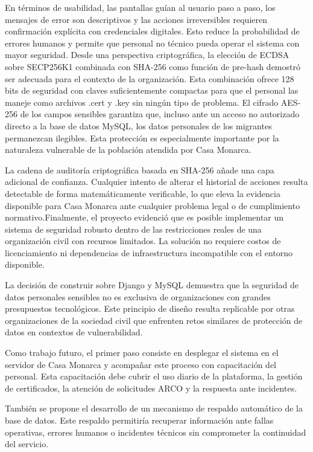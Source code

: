 \documentclass[10pt,letterpaper]{report}
\begin{document}
En términos de usabilidad, las pantallas guían al usuario paso a paso, los mensajes de error son descriptivos y las acciones irreversibles requieren confirmación explícita con credenciales digitales. Esto reduce la probabilidad de errores humanos y permite que personal no técnico pueda operar el sistema con mayor seguridad. Desde una perspectiva criptográfica, la elección de ECDSA sobre SECP256K1 combinada con SHA-256 como función de pre-hash demostró ser adecuada para el contexto de la organización. Esta combinación ofrece 128 bits de seguridad con claves suficientemente compactas para que el personal las maneje como archivos .cert y .key sin ningún tipo de problema. El cifrado AES-256 de los campos sensibles garantiza que, incluso ante un acceso no autorizado directo a la base de datos MySQL, los datos personales de los migrantes permanezcan ilegibles. Esta protección es especialmente importante por la naturaleza vulnerable de la población atendida por Casa Monarca.

La cadena de auditoría criptográfica basada en SHA-256 añade una capa adicional de confianza. Cualquier intento de alterar el historial de acciones resulta detectable de forma matemáticamente verificable, lo que eleva la evidencia disponible para Casa Monarca ante cualquier problema legal o de cumplimiento normativo.Finalmente, el proyecto evidenció que es posible implementar un sistema de seguridad robusto dentro de las restricciones reales de una organización civil con recursos limitados. La solución no requiere costos de licenciamiento ni dependencias de infraestructura incompatible con el entorno disponible.

La decisión de construir sobre Django y MySQL demuestra que la seguridad de datos personales sensibles no es exclusiva de organizaciones con grandes presupuestos tecnológicos. Este principio de diseño resulta replicable por otras organizaciones de la sociedad civil que enfrenten retos similares de protección de datos en contextos de vulnerabilidad.

Como trabajo futuro, el primer paso consiste en desplegar el sistema en el servidor de Casa Monarca y acompañar este proceso con capacitación del personal. Esta capacitación debe cubrir el uso diario de la plataforma, la gestión de certificados, la atención de solicitudes ARCO y la respuesta ante incidentes.

También se propone el desarrollo de un mecanismo de respaldo automático de la base de datos. Este respaldo permitiría recuperar información ante fallas operativas, errores humanos o incidentes técnicos sin comprometer la continuidad del servicio.
\end{document}
